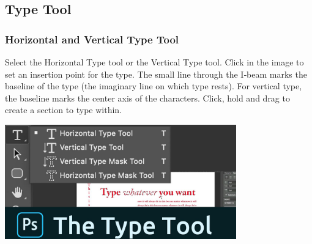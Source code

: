 \documentclass{beamer}
\begin{document}
		\subsection{Type Tool}
\begin{frame}
	\frametitle{Horizontal and Vertical Type Tool}
	\begin{outline}
		\1 Select the Horizontal Type tool or the Vertical Type tool.
		\1 Click in the image to set an insertion point for the type. 
		\2 The small line through the I‑beam marks the baseline of the type (the imaginary line on which type rests). 
		\2 For vertical type, the baseline marks the center axis of the characters.
		\1 Click, hold and drag to create a section to type within. 
	\end{outline}
	\begin{center}
		\includegraphics[width = 0.75\textwidth]{images/maxresdefault.png}
	\end{center}
\end{frame}
\end{document}
